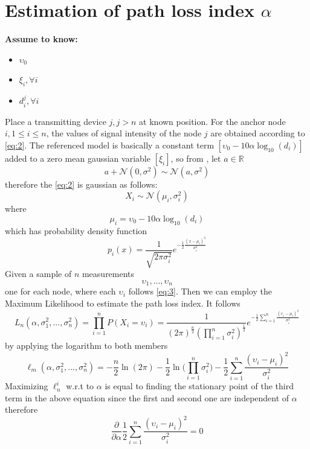 \documentclass[12pt,twoside]{report}
\begin{document}
\section{Estimation of path loss index $\alpha$}
  \begin{center}
  \textbf{Assume to know:}
  \begin{itemize}
    \centering
    \item $\upsilon_0$
    \item $\xi_i,\forall i$
    \item $d_i^j,\forall i$
  \end{itemize}
  \end{center}
  Place a transmitting device $j,j>n$ at known position. For the anchor node $i,1\leq i\leq n$, the values of signal intensity of the node $j$ are obtained according to \ref{eq:2}. The referenced model is basically a constant term $[\upsilon_0-10\alpha\log_{10}(d_i)]$ added to a zero mean gaussian variable $[\xi_i]$, so from \cite{alma9926534668905776}, let $a \in \mathbb{R}$
\begin{equation}
a+\mathcal{N}(0,\sigma^2)\sim\mathcal{N}(a,\sigma^2)
\end{equation} therefore the \ref{eq:2} is gaussian as follows:
\begin{equation}
    X_i\sim \mathcal{N}(\mu_i,\sigma^2_i)
    \label{eq:3}
\end{equation}
where 
\begin{equation}
    \mu_i = \upsilon_0-10\alpha\log_{10}(d_i)
\end{equation}
which has probability density function
\begin{equation}
    p_i(x)=\frac{1}{\sqrt{2\pi\sigma_i^2}}e^{-\frac{1}{2}\frac{(x-\mu_i)^2}{\sigma^2_i}}
\end{equation} 
Given a sample of $n$ measurements $$\upsilon_1,...,\upsilon_n$$ one for each node, where each $\upsilon_i$ follows \ref{eq:3}. Then we can employ the Maximum Likelihood to estimate the path loss index. It follows
\begin{equation}
    L_n(\alpha,\sigma_1^2,...,\sigma_n^2)=\prod_{i=1}^nP(X_i=\upsilon_i)=
    \frac{1}{(2\pi)^{\frac{n}{2}}(\prod_{i=1}^n\sigma_i^2)^\frac{1}{2}}e^{-\frac{1}{2}\sum_{i=1}^n\frac{(\upsilon_i-\mu_i)^2}{\sigma^2_i}}
\end{equation}
by applying the logarithm to both members
\begin{equation}
    \ell_m(\alpha,\sigma_1^2,...,\sigma_n^2)=-\frac{n}{2}\ln(2\pi)-\frac{1}{2}\ln\bigg(\prod_{i=1}^n\sigma^2_i\bigg)-\frac{1}{2}\sum_{i=1}^n\frac{(\upsilon_i-\mu_i)^2}{\sigma^2_i}
\end{equation}
Maximizing $\ell_n^i$ w.r.t to $\alpha$ is equal to finding the stationary point of the third term in the above equation since the first and second one are independent of $\alpha$ therefore \cite{MUNOZ200923} 
\begin{equation}
\frac{\partial}{\partial \alpha} \frac{1}{2}\sum_{i=1}^n\frac{(\upsilon_i-\mu_i)^2}{\sigma^2_i} =0
\end{equation}
\end{document}
